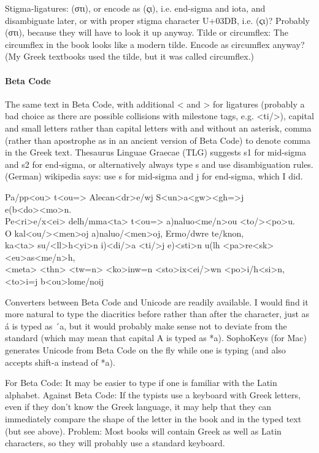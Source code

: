 Stigma-ligatures: (στι), or encode as (ςι), i.e. end-sigma and iota, and disambiguate later, or with proper stigma character U+03DB, i.e. (ϛι)? Probably (στι), because they will have to look it up anyway. Tilde or circumflex: The circumflex in the book looks like a modern tilde. Encode as circumflex anyway? (My Greek textbooks used the tilde, but it was called circumflex.)

\paragraph{Beta Code}

The same text in Beta Code, with additional < and > for ligatures (probably a bad choice as there are possible collisions with milestone tags, e.g. <ti/>), capital and small letters rather than capital letters with and without an asterisk, comma (rather than apostrophe as in an ancient version of  Beta Code) to denote comma in the Greek text. Thesaurus Linguae Graecae (TLG) suggests s1 for mid-sigma and s2 for end-sigma, or alternatively always type s and use disambiguation rules. (German) wikipedia says: use s for mid-sigma and j for end-sigma, which I did.

\begin{typeBetacode}
Pa/pp<ou> t<ou=> Alecan<dr>e/wj S<un>a<gw><gh=>j \\
e(b<do><mo>n. \\
Pe<ri>e/x<ei> de\bs lh/mma<ta> t<ou=> a)naluo<me/n>ou <to/><po>u. \\
O kal<ou/><men>oj a)naluo/<men>oj, Ermo/dwre te/knon, \\
ka<ta\bs> su/<ll>h<yi>n i)<di/>a <ti/>j e)<sti>n u(lh <pa>re<sk><eu>as<me/n>h, \\
<meta\bs> <thn\bs> <tw=n> <ko>inw=n <sto>ix<ei/>wn <po>i/h<si>n, <to>i=j b<ou>lome/noij 
\end{typeBetacode}

Converters between Beta Code and Unicode are readily available. I would find it more natural to type the diacritics before rather than after the character, just as á is typed as ´a, but it would probably make sense not to deviate from the standard (which may mean that capital A is typed as *a). SophoKeys (for Mac) generates Unicode from Beta Code on the fly while one is typing (and also accepts shift-a instead of *a).

For Beta Code: It may be easier to type if one is familiar with the Latin alphabet. Against Beta Code: If the typists use a keyboard with Greek letters, even if they don't know the Greek language, it may help that they can immediately compare the shape of the letter in the book and in the typed text (but see above). Problem: Most books will contain Greek as well as Latin characters, so they will probably use a standard keyboard.

